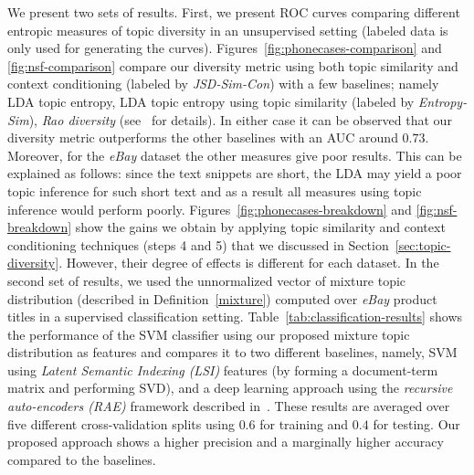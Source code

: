 \documentclass{article} %
\begin{document}
We present two sets of results. First, we present
ROC curves comparing different entropic measures of topic diversity in an unsupervised setting 
(labeled data is only used for generating the curves). Figures~\ref{fig:phonecases-comparison} and \ref{fig:nsf-comparison}
compare our diversity metric using both topic similarity and context
conditioning (labeled by {\em JSD-Sim-Con}) with a few baselines;
namely LDA topic entropy, LDA topic entropy using topic similarity
(labeled by {\em Entropy-Sim}), {\em Rao diversity}
(see~\cite{bache:2013} for details). In either case it can be observed
that our diversity metric outperforms the other baselines with an AUC
around $0.73$. Moreover, for the {\em eBay} dataset the other measures
give poor results. This can be explained as follows: since the
text snippets are short, the LDA may yield a poor topic inference for such short text and as a result all measures using topic inference would perform poorly. Figures~\ref{fig:phonecases-breakdown} and \ref{fig:nsf-breakdown} show the gains we obtain by applying topic similarity and context conditioning techniques (steps 4 and 5) that we discussed in Section~\ref{sec:topic-diversity}. However, their degree of effects is different for each
dataset.  In the second set of results, we used the unnormalized vector of mixture topic
distribution (described in Definition~\ref{mixture}) computed over
{\em eBay} product titles in a supervised classification
setting. Table~\ref{tab:classification-results} shows
the performance of the SVM classifier using our proposed mixture topic
distribution as features and compares it to two different baselines, namely, SVM using
{\em Latent Semantic Indexing (LSI)} features (by forming a
document-term matrix and performing SVD), and a deep learning approach
using the {\em recursive auto-encoders (RAE)} framework described
in~\cite{Socher:2011:SRA:2145432.2145450}. These results are averaged
over five different cross-validation splits using $0.6$ for training
and $0.4$ for testing. Our proposed approach shows a higher precision
and a marginally higher accuracy compared to the baselines.
\end{document}
